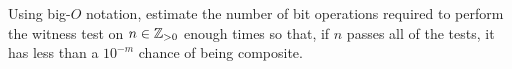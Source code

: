 \begin{problem}
  Using big-$O$ notation, estimate the number of bit operations
  required to perform the witness test on $n \in \mathbb{Z}_{>0}$ enough times
  so that, if $n$ passes all of the tests, it has less than a
  $10^{-m}$ chance of being composite.
\end{problem}
